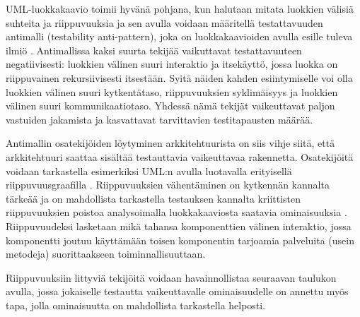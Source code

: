 \documentclass[finnish]{tktltiki2}
\numberwithin{table}{section}
\theoremstyle{definition}
\theoremstyle{remark}
\begin{document}
UML-luokkakaavio toimii hyvänä pohjana, kun halutaan mitata luokkien välisiä suhteita ja riippuvuuksia \citep{baudry_testability_2002} ja sen avulla voidaan määritellä testattavuuden antimalli (testability anti-pattern), joka on luokkakaavioiden avulla esille tuleva ilmiö \citep{baudry_measuring_2003}. Antimallissa kaksi suurta tekijää vaikuttavat testattavuuteen negatiivisesti: luokkien välinen suuri interaktio ja itsekäyttö, jossa luokka on riippuvainen rekursiivisesti itsestään. Syitä näiden kahden esiintymiselle voi olla luokkien välinen suuri kytkentätaso, riippuvuuksien syklimäisyys ja luokkien välinen suuri kommunikaatiotaso. Yhdessä nämä tekijät vaikeuttavat paljon vastuiden jakamista ja kasvattavat tarvittavien testitapausten määrää. 

Antimallin osatekijöiden löytyminen arkkitehtuurista on siis vihje siitä, että arkkitehtuuri saattaa sisältää testauttavia vaikeuttavaa rakennetta. Osatekijöitä voidaan tarkastella esimerkiksi UML:n avulla luotavalla erityisellä riippuvuusgraafilla \citep{baudry_testability_2002}. Riippuvuuksien vähentäminen on kytkennän kannalta tärkeää ja on mahdollista tarkastella testauksen kannalta kriittisten riippuvuuksien poistoa analysoimalla luokkakaaviosta saatavia ominaisuuksia \citep{Jungmayr:2002}. Riippuvuudeksi lasketaan mikä tahansa komponenttien välinen interaktio, jossa komponentti joutuu käyttämään toisen komponentin tarjoamia palveluita (usein metodeja) suorittaakseen toiminnallisuuttaan. 

Riippuvuuksiin littyviä tekijöitä voidaan havainnollistaa seuraavan taulukon avulla, jossa jokaiselle testautta vaikeuttavalle ominaisuudelle on annettu myös tapa, jolla ominaisuutta on mahdollista tarkastella helposti.


\begin{table}[H]
	\centering
	\setlength{\extrarowheight}{10pt}%
\end{table}
\end{document}
